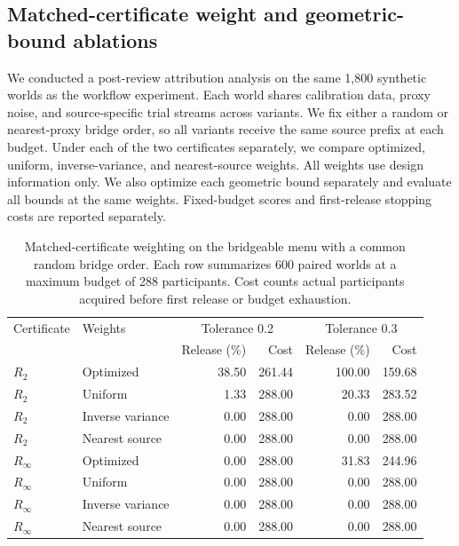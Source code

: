 \subsection{Matched-certificate weight and geometric-bound ablations}
We conducted a post-review attribution analysis on the same 1,800 synthetic worlds as the workflow experiment. Each world shares calibration data, proxy noise, and source-specific trial streams across variants. We fix either a random or nearest-proxy bridge order, so all variants receive the same source prefix at each budget. Under each of the two certificates separately, we compare optimized, uniform, inverse-variance, and nearest-source weights. All weights use design information only. We also optimize each geometric bound separately and evaluate all bounds at the same weights. Fixed-budget scores and first-release stopping costs are reported separately.

\begin{table}[htbp]
\centering\small
\caption{Matched-certificate weighting on the bridgeable menu with a common random bridge order. Each row summarizes 600 paired worlds at a maximum budget of 288 participants. Cost counts actual participants acquired before first release or budget exhaustion.}
\label{tab:ablation_weights}
\begin{tabular}{llrr rr}
\toprule
Certificate & Weights & \multicolumn{2}{c}{Tolerance 0.2} & \multicolumn{2}{c}{Tolerance 0.3} \\
 & & Release (\%) & Cost & Release (\%) & Cost \\
\midrule
$R_2$ & Optimized & 38.50 & 261.44 & 100.00 & 159.68 \\
$R_2$ & Uniform & 1.33 & 288.00 & 20.33 & 283.52 \\
$R_2$ & Inverse variance & 0.00 & 288.00 & 0.00 & 288.00 \\
$R_2$ & Nearest source & 0.00 & 288.00 & 0.00 & 288.00 \\
$R_\infty$ & Optimized & 0.00 & 288.00 & 31.83 & 244.96 \\
$R_\infty$ & Uniform & 0.00 & 288.00 & 0.00 & 288.00 \\
$R_\infty$ & Inverse variance & 0.00 & 288.00 & 0.00 & 288.00 \\
$R_\infty$ & Nearest source & 0.00 & 288.00 & 0.00 & 288.00 \\
\bottomrule
\end{tabular}
\end{table}

